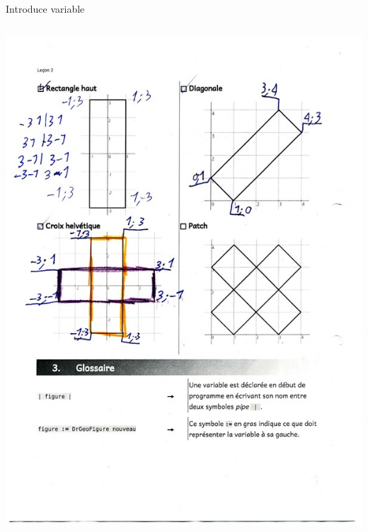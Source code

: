 \documentclass{beamer}
\begin{document}
\begin{frame}[fragile]{Introduce variable\cite{lesson2}}
\begin{columns}[t]
\begin{column}{0.5\textwidth}
      \includegraphics[width=\textwidth]{lesson2Challenges.jpg}
    \end{column}  
  \end{columns}  
\end{frame}
\end{document}
